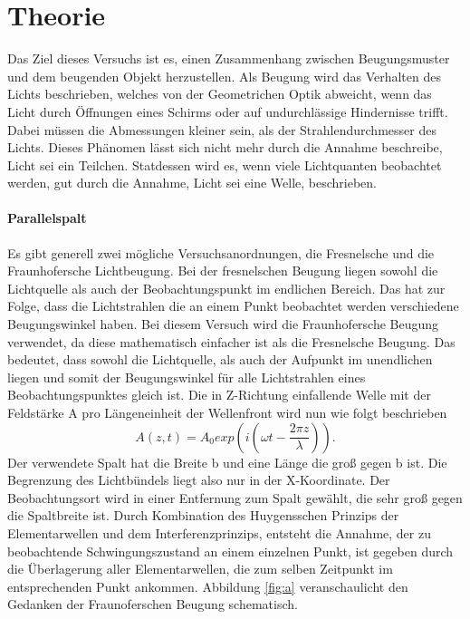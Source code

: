 \section{Theorie}
\label{sec:Theorie}
Das Ziel dieses Versuchs ist es, einen Zusammenhang zwischen Beugungsmuster und dem beugenden Objekt herzustellen.
Als Beugung wird das Verhalten des Lichts beschrieben, welches von der Geometrichen Optik abweicht, wenn das Licht 
durch Öffnungen eines Schirms oder auf undurchlässige Hindernisse trifft. Dabei müssen die Abmessungen kleiner sein, 
als der Strahlendurchmesser des Lichts. Dieses Phänomen lässt sich nicht mehr durch die Annahme beschreibe, Licht sei ein Teilchen. 
Statdessen wird es, wenn viele Lichtquanten beobachtet werden, gut durch die Annahme, Licht sei eine Welle, beschrieben.

\paragraph{Parallelspalt}
Es gibt generell zwei mögliche Versuchsanordnungen, die Fresnelsche und die Fraunhofersche Lichtbeugung.
Bei der fresnelschen Beugung liegen sowohl die Lichtquelle als auch der Beobachtungspunkt im endlichen Bereich. 
Das hat zur Folge, dass die Lichtstrahlen die an einem Punkt beobachtet werden verschiedene Beugungswinkel haben.
Bei diesem Versuch wird die Fraunhofersche Beugung verwendet, da diese mathematisch einfacher ist als die
Fresnelsche Beugung. Das bedeutet, dass sowohl die Lichtquelle, als auch der Aufpunkt im unendlichen liegen und somit der 
Beugungswinkel für alle Lichtstrahlen eines Beobachtungspunktes gleich ist. 
Die in Z-Richtung einfallende Welle mit der Feldstärke A pro Längeneinheit der Wellenfront wird nun wie folgt beschrieben
\begin{equation}
    \label{eq:1}
    A(z,t) = A_0 exp \left( i(\omega t - \frac{2 \pi z}{\lambda})\right).
\end{equation}
Der verwendete Spalt hat die Breite b und eine Länge die groß gegen b ist. Die Begrenzung des Lichtbündels 
liegt also nur in der X-Koordinate. Der Beobachtungsort wird in einer Entfernung zum Spalt gewählt, die sehr groß 
gegen die Spaltbreite ist.
Durch Kombination des Huygensschen Prinzips der Elementarwellen und dem Interferenzprinzips, entsteht die Annahme, 
der zu beobachtende Schwingungszustand an einem einzelnen Punkt, ist gegeben durch die Überlagerung 
aller Elementarwellen, die zum selben Zeitpunkt im entsprechenden Punkt ankommen.
Abbildung \ref{fig:a} veranschaulicht den Gedanken der Fraunoferschen Beugung schematisch.
